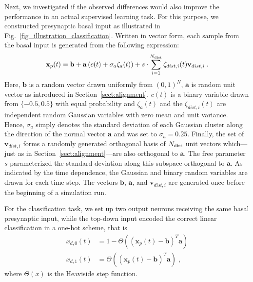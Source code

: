 \documentclass[utf8]{frontiersSCNS} %
\begin{document}
Next, we investigated if the observed differences would also improve
the performance in an actual supervised learning task.
For this purpose, we constructed presynaptic basal 
input as illustrated in Fig.~\ref{fig_illustration_classification}.
Written in vector form, each sample from the basal 
input is generated from the following expression:
\begin{equation}
\mathbf{x}_p(t) = \mathbf{b} + \mathbf{a}\left(c(t) + \sigma_a \zeta_a(t) \right) 
+ s \cdot \sum_{i=1}^{N_{\rm dist}} \zeta_{dist,i}(t) \mathbf{v}_{dist,i} \; .
\end{equation}
Here, $\mathbf{b}$ is a random vector drawn uniformly from
$(0,1)^N$, $\mathbf{a}$ is random unit vector as introduced in 
Section~\ref{sect:alignment}, $c(t)$ is a binary variable drawn 
from $\{-0.5,0.5\}$ with equal probability and $\zeta_a(t)$ and the
$\zeta_{dist,i}(t)$ are independent random Gaussian variables with 
zero mean and unit variance. 
Hence, $\sigma_a$ simply denotes the standard deviation of each Gaussian
cluster along the direction of the normal vector $\mathbf{a}$ and was
set to $\sigma_a = 0.25$. 
Finally, the set of $\mathbf{v}_{dist,i}$ forms a randomly generated
orthogonal basis of $N_{\rm dist}$ unit vectors which---just as in 
Section~\ref{sect:alignment}---are also orthogonal to $\mathbf{a}$.
The free parameter $s$ parameterized
the standard deviation along this subspace orthogonal to $\mathbf{a}$.
As indicated by the time dependence, the Gaussian and binary random
variables are drawn for each time step. The vectors
$\mathbf{b}$, $\mathbf{a}$, and $\mathbf{v}_{dist,i}$ are generated
once before the beginning of a simulation run.

For the classification task, we set up two output neurons receiving
the same basal presynaptic input, while the top-down input encoded
the correct linear classification in a one-hot scheme, that is
\begin{align}
x_{d,0}(t) &= 1 - \Theta\left( \left(\mathbf{x}_p(t) - 
\mathbf{b}\right)^T \mathbf{a}\right) \\
x_{d,1}(t) &= \Theta\left( \left(\mathbf{x}_p(t) - 
\mathbf{b}\right)^T \mathbf{a}\right) \; ,
\end{align}
where $\Theta(x)$ is the Heaviside step function.
\end{document}
